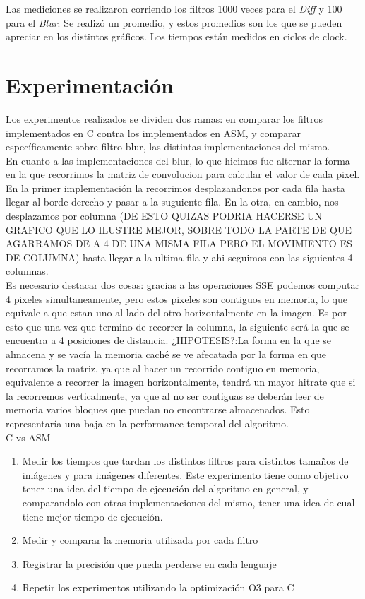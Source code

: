\documentclass[10pt,a4paper,spanish]{article}
\begin{document}
Las mediciones se realizaron corriendo los filtros 1000 veces para el \textit{Diff} y 100 para el \textit{Blur}. Se realizó un promedio, y estos promedios son los que se pueden apreciar en los distintos gráficos. Los tiempos están medidos en ciclos de clock.

\section{Experimentación}

Los experimentos realizados se dividen dos ramas: en comparar los filtros implementados en C contra los implementados en ASM, y comparar específicamente sobre filtro blur, las distintas implementaciones del mismo. \\

En cuanto a las implementaciones del blur, lo que hicimos fue alternar la forma en la que recorrimos la matriz de convolucion para calcular el valor de cada pixel. En la primer implementación la recorrimos desplazandonos por cada fila hasta llegar al borde derecho y pasar a la suguiente fila. En la otra, en cambio, nos desplazamos por columna (DE ESTO QUIZAS PODRIA HACERSE UN GRAFICO QUE LO ILUSTRE MEJOR, SOBRE TODO LA PARTE DE QUE AGARRAMOS DE A 4 DE UNA MISMA FILA PERO EL MOVIMIENTO ES DE COLUMNA) hasta llegar a la ultima fila y ahi seguimos con las siguientes 4 columnas. \\

Es necesario destacar dos cosas: gracias a las operaciones SSE podemos computar 4 pixeles simultaneamente, pero estos pixeles son contiguos en memoria, lo que equivale a que estan uno al lado del otro horizontalmente en la imagen. Es por esto que una vez que termino de recorrer la columna, la siguiente será la que se encuentra a 4 posiciones de distancia.
¿HIPOTESIS?:La forma en la que se almacena y se vacía la memoria caché se ve afecatada por la forma en que recorramos la matriz, ya que al hacer un recorrido contiguo en memoria, equivalente a recorrer la imagen horizontalmente, tendrá un mayor hitrate que si la recorremos verticalmente, ya que al no ser contiguas se deberán leer de memoria varios bloques que puedan no encontrarse almacenados. Esto representaría una baja en la performance temporal del algoritmo. \\

C vs ASM

\begin{enumerate}
	\item Medir los tiempos que tardan los distintos filtros para distintos tamaños de imágenes y para imágenes diferentes. Este experimento tiene como objetivo tener una idea del tiempo de ejecución del algoritmo en general, y comparandolo con otras implementaciones del mismo, tener una idea de cual tiene mejor tiempo de ejecución.
	\item Medir y comparar la memoria utilizada por cada filtro
	\item Registrar la precisión que pueda perderse en cada lenguaje
	\item Repetir los experimentos utilizando la optimización O3 para C
\end{enumerate}
\end{document}
